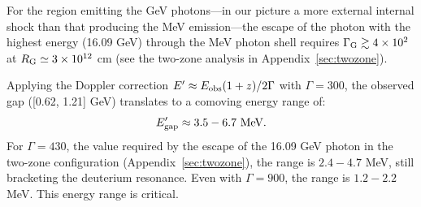 \documentclass[prd,twocolumn,amsmath,amssymb,aps,linenumbers]{revtex4-2} %
\providecommand{\DIFaddtex}[1]{{\protect\color{blue} \sf #1}} %
\providecommand{\DIFaddbegin}{} %
\providecommand{\DIFaddend}{} %
\providecommand{\DIFdelend}{} %
\providecommand{\DIFadd}[1]{\texorpdfstring{\DIFaddtex{#1}}{#1}} %
\newcommand{\DIFaddincludegraphics}[2][]{{\color{blue}\fbox{\DIFOincludegraphics[#1]{#2}}}} %
\DeclareRobustCommand{\DIFaddbegin}{\DIFOaddbegin \let\includegraphics\DIFaddincludegraphics} %
\DeclareRobustCommand{\DIFaddend}{\DIFOaddend \let\includegraphics\DIFOincludegraphics} %
\DeclareRobustCommand{\DIFdelend}{\DIFOaddend \let\includegraphics\DIFOincludegraphics} %
\begin{document}
\DIFdelend \DIFaddbegin \DIFadd{For the region emitting the GeV photons---in our picture a more external internal shock than that producing the MeV emission---the escape of the photon with the highest energy (16.09 GeV) through the MeV photon shell requires $\Gamma_{\rm G}\gtrsim4\times10^{2}$ at $R_{\rm G}\simeq3\times10^{12}$ cm (see the two-zone analysis in Appendix~\ref{sec:twozone}).
}\DIFaddend 


Applying the Doppler correction $E' \approx E_{\rm obs} (1+z) / 2\Gamma$ with $\Gamma=300$, the observed gap ([0.62, 1.21] GeV) translates to a comoving energy range of:
\begin{equation}
E_{\rm gap}^{\prime} \approx 3.5 - 6.7 \text{ MeV}.
\end{equation}
\DIFaddbegin \DIFadd{For $\Gamma=430$, the value required by the escape of the 16.09 GeV photon in the two-zone configuration (Appendix~\ref{sec:twozone}), the range is $2.4-4.7$ MeV, still bracketing the deuterium resonance. Even with $\Gamma=900$, the range is $1.2-2.2$ MeV. This energy range is critical.
}
\end{document}
